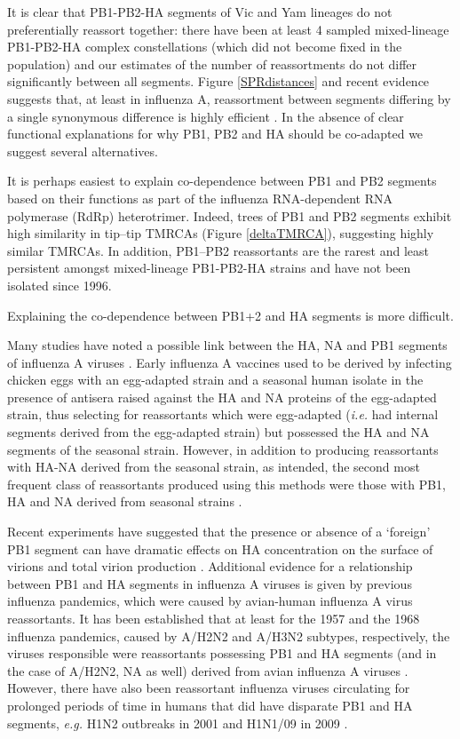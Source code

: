 \documentclass[11pt,oneside,letterpaper]{article}
\begin{document}
It is clear that PB1-PB2-HA segments of Vic and Yam lineages do not preferentially reassort together: there have been at least 4 sampled mixed-lineage PB1-PB2-HA complex constellations (which did not become fixed in the population) and our estimates of the number of reassortments do not differ significantly between all segments.
Figure \ref{SPRdistances} and recent evidence suggests that, at least in influenza A, reassortment between segments differing by a single synonymous difference is highly efficient \cite{marshall2013}.
In the absence of clear functional explanations for why PB1, PB2 and HA should be co-adapted we suggest several alternatives.

It is perhaps easiest to explain co-dependence between PB1 and PB2 segments based on their functions as part of the influenza RNA-dependent RNA polymerase (RdRp) heterotrimer.
Indeed, trees of PB1 and PB2 segments exhibit high similarity in tip--tip TMRCAs (Figure \ref{deltaTMRCA}), suggesting highly similar TMRCAs.
In addition, PB1--PB2 reassortants are the rarest and least persistent amongst mixed-lineage PB1-PB2-HA strains and have not been isolated since 1996.

Explaining the co-dependence between PB1+2 and HA segments is more difficult.

Many studies have noted a possible link between the HA, NA and PB1 segments of influenza A viruses \cite{bergeron2010,fulvini2011}.
Early influenza A vaccines used to be derived by infecting chicken eggs with an egg-adapted strain and a seasonal human isolate in the presence of antisera raised against the HA and NA proteins of the egg-adapted strain, thus selecting for reassortants which were egg-adapted (\textit{i.e.} had internal segments derived from the egg-adapted strain) but possessed the HA and NA segments of the seasonal strain.
However, in addition to producing reassortants with HA-NA derived from the seasonal strain, as intended, the second most frequent class of reassortants produced using this methods were those with PB1, HA and NA derived from seasonal strains \cite{bergeron2010,fulvini2011}.

Recent experiments have suggested that the presence or absence of a `foreign' PB1 segment can have dramatic effects on HA concentration on the surface of virions and total virion production \cite{cobbin2013}.
Additional evidence for a relationship between PB1 and HA segments in influenza A viruses is given by previous influenza pandemics, which were caused by avian-human influenza A virus reassortants.
It has been established that at least for the 1957 and the 1968 influenza pandemics, caused by A/H2N2 and A/H3N2 subtypes, respectively, the viruses responsible were reassortants possessing PB1 and HA segments (and in the case of A/H2N2, NA as well) derived from avian influenza A viruses \cite{kawaoka1989}.
However, there have also been reassortant influenza viruses circulating for prolonged periods of time in humans that did have disparate PB1 and HA segments, \textit{e.g.} H1N2 outbreaks in 2001 \cite{gregory2002} and H1N1/09 in 2009 \cite{smith2009}.
\end{document}
